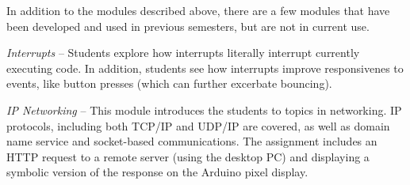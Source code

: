 In addition to the modules described above, there are a few modules that
have been developed and used in previous semesters, but are not in current use.

\emph{Interrupts} --
Students explore how interrupts literally interrupt currently executing code.  In addition, students see how interrupts improve responsivenes to events, like button presses (which can further excerbate bouncing).

\emph{IP Networking} --
This module introduces the students to topics in networking.  IP protocols,
including both TCP/IP and UDP/IP are covered, as well as domain name service
and socket-based communications. The assignment includes an HTTP request
to a remote server (using the desktop PC) and displaying a symbolic version
of the response on the Arduino pixel display.
